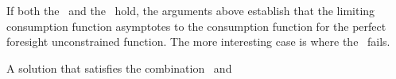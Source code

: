 \documentclass[./BufferStockTheory.tex]{subfiles}
\begin{document}
If both the \GIC~and the \RIC~hold, the arguments above establish that the limiting consumption
function asymptotes to the consumption function for the perfect foresight unconstrained function.
The more interesting case is where the \GIC~fails.
\begin{comment}
\WW{}{The same
steps as above lead to the same implication that this requires
$\InvEpShkInv < (\Rfree/\PGro)^{1/\CRRA}\uInvEpShkuInv^{1-1/\CRRA}$,
but when the \RIC~$\Rfree/\PGro > 1$ holds this condition is much more
easily satisfied.}
If the \FVAC~holds but the \GIC~does not, the parameters must satisfy:
\begin{equation}\begin{gathered}\begin{aligned}
\DiscFac \PGro^{1-\CRRA}\Ex[\pshk^{1-\CRRA}] & < 1 < (\Rfree\DiscFac)^{1/\CRRA}(\PGro\Ex[\pshk^{-1}])^{-1}. \label{eq:FVACnotGIC}
\end{aligned}\end{gathered}\end{equation}

Note first that by Jensens's inequality $\Ex[\pshk^{1-\CRRA}] > 1$ and $(\Ex[\pshk^{-1}])^{-1} < 1$,
so \eqref{eq:FVACnotGIC} is stronger than
\begin{equation}\begin{gathered}\begin{aligned}
\DiscFac \PGro^{1-\CRRA} & < 1 < (\Rfree\DiscFac)^{1/\CRRA}/\PGro. \label{eq:PFFVACnotPFGIC}
\end{aligned}\end{gathered}\end{equation}


Suppose $\PGro=1$, $\CRRA=2$ and $\pshk$ is lognormally distributed with $\sigma^{2}_{\pshk}=0.01$ (that is, $\log \pshk \sim \mathcal{N}(-\sigma_{\psi}^{2}/2,\sigma_{\psi}^{2})$) so that $\Ex_{t}[\pshk_{t+1}^{1-\CRRA}] =\Ex_{t}[\pshk_{t+1}^{-1}] =\exp(\sigma^{2}_{\psi})=e^{0.01}.$  Then the condition becomes
\begin{equation}\begin{gathered}\begin{aligned}
\DiscFac e^{0.01} & < 1 < (\Rfree \DiscFac)^{1/2}e^{-0.01}
\end{aligned}\end{gathered}\end{equation}
which can be satisfied, for example, by $\DiscFac = 0.96$ and $\Rfree=1.08$.
\end{comment}
A solution that satisfies the combination \FVAC~and
\end{document}
